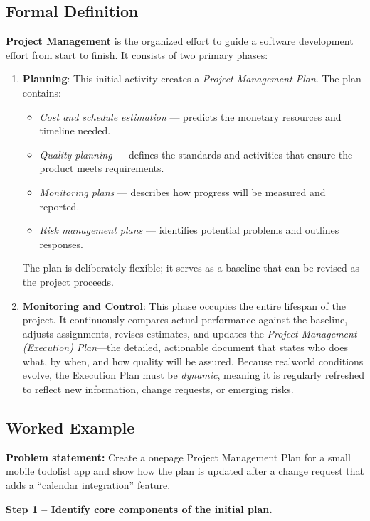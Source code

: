 \documentclass[12pt, a4paper]{article}
\begin{document}
\subsection{Formal Definition}
\textbf{Project Management} is the organized effort to guide a software development effort from start to finish.  It consists of two primary phases:

\begin{enumerate}
    \item \textbf{Planning}: This initial activity creates a \emph{Project Management Plan}.  The plan contains:
    \begin{itemize}
        \item \textit{Cost and schedule estimation} --- predicts the monetary resources and timeline needed.
        \item \textit{Quality planning} --- defines the standards and activities that ensure the product meets requirements.
        \item \textit{Monitoring plans} --- describes how progress will be measured and reported.
        \item \textit{Risk management plans} --- identifies potential problems and outlines responses.
    \end{itemize}
    The plan is deliberately flexible; it serves as a baseline that can be revised as the project proceeds.
    
    \item \textbf{Monitoring and Control}: This phase occupies the entire lifespan of the project.  It continuously compares actual performance against the baseline, adjusts assignments, revises estimates, and updates the \emph{Project Management (Execution) Plan}---the detailed, actionable document that states who does what, by when, and how quality will be assured.  Because realworld conditions evolve, the Execution Plan must be \emph{dynamic}, meaning it is regularly refreshed to reflect new information, change requests, or emerging risks.
\end{enumerate}

\subsection{Worked Example}
\textbf{Problem statement:}  Create a onepage Project Management Plan for a small mobile todolist app and show how the plan is updated after a change request that adds a ``calendar integration'' feature.

\textbf{Step 1 -- Identify core components of the initial plan.}
\end{document}
